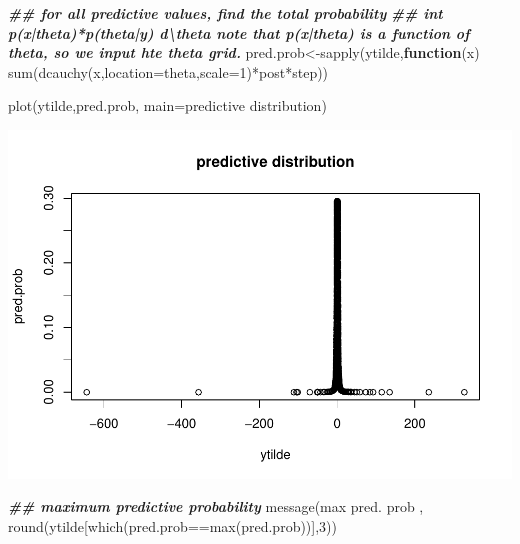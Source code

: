 \documentclass[
]{book}
\newenvironment{Shaded}{\begin{snugshade}}{\end{snugshade}}
\newcommand{\AttributeTok}[1]{\textcolor[rgb]{0.77,0.63,0.00}{#1}}
\newcommand{\ControlFlowTok}[1]{\textcolor[rgb]{0.13,0.29,0.53}{\textbf{#1}}}
\newcommand{\DecValTok}[1]{\textcolor[rgb]{0.00,0.00,0.81}{#1}}
\newcommand{\DocumentationTok}[1]{\textcolor[rgb]{0.56,0.35,0.01}{\textbf{\textit{#1}}}}
\newcommand{\FunctionTok}[1]{\textcolor[rgb]{0.00,0.00,0.00}{#1}}
\newcommand{\NormalTok}[1]{#1}
\newcommand{\OtherTok}[1]{\textcolor[rgb]{0.56,0.35,0.01}{#1}}
\newcommand{\SpecialCharTok}[1]{\textcolor[rgb]{0.00,0.00,0.00}{#1}}
\newcommand{\StringTok}[1]{\textcolor[rgb]{0.31,0.60,0.02}{#1}}
\theoremstyle{definition}
\theoremstyle{definition}
\theoremstyle{definition}
\theoremstyle{definition}
\theoremstyle{remark}
\begin{document}
\begin{Shaded}
\begin{Highlighting}[]
\DocumentationTok{\#\# for all predictive values,  find the total probability  }
   \DocumentationTok{\#\# int p(x|theta)*p(theta|y) d\textbackslash{}theta  note that p(x|theta) is a function of theta, so we input hte theta grid.}
\NormalTok{ pred.prob}\OtherTok{\textless{}{-}}\FunctionTok{sapply}\NormalTok{(ytilde,}\ControlFlowTok{function}\NormalTok{(x) }\FunctionTok{sum}\NormalTok{(}\FunctionTok{dcauchy}\NormalTok{(x,}\AttributeTok{location=}\NormalTok{theta,}\AttributeTok{scale=}\DecValTok{1}\NormalTok{)}\SpecialCharTok{*}\NormalTok{post}\SpecialCharTok{*}\NormalTok{step))  }
  
  \FunctionTok{plot}\NormalTok{(ytilde,pred.prob, }\AttributeTok{main=}\StringTok{\textquotesingle{}predictive distribution\textquotesingle{}}\NormalTok{)}
\end{Highlighting}
\end{Shaded}

\includegraphics{_main_files/figure-latex/unnamed-chunk-22-1.pdf}

\begin{Shaded}
\begin{Highlighting}[]
  \DocumentationTok{\#\# maximum predictive probability}
  \FunctionTok{message}\NormalTok{(}\StringTok{\textquotesingle{}max pred. prob \textquotesingle{}}\NormalTok{, }\FunctionTok{round}\NormalTok{(ytilde[}\FunctionTok{which}\NormalTok{(pred.prob}\SpecialCharTok{==}\FunctionTok{max}\NormalTok{(pred.prob))],}\DecValTok{3}\NormalTok{))}
\end{Highlighting}
\end{Shaded}
\end{document}
